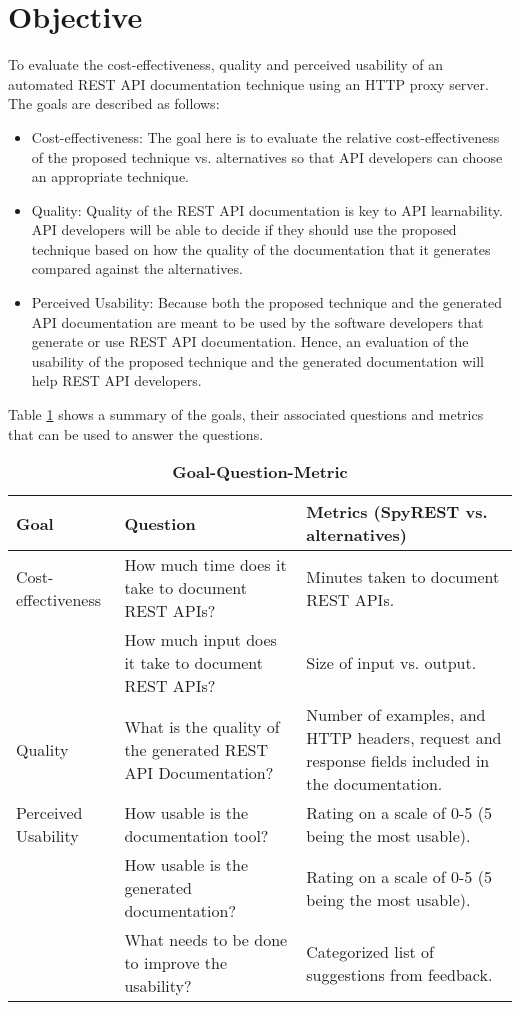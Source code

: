 \documentclass{article}
\begin{document}
\section{Objective}
To evaluate the cost-effectiveness, quality and perceived usability of an automated REST API documentation technique using an HTTP proxy server. The goals are described as follows:

\begin{itemize}
  \item Cost-effectiveness: The goal here is to evaluate the relative cost-effectiveness of the proposed technique vs. alternatives so that API developers can choose an appropriate technique.
  \item Quality: Quality of the REST API documentation is key to API learnability. API developers will be able to decide if they should use the proposed technique based on how the quality of the documentation that it generates compared against the alternatives.
  \item Perceived Usability: Because both the proposed technique and the generated API documentation are meant to be used by the software developers that generate or use REST API documentation. Hence, an evaluation of the usability of the proposed technique and the generated documentation will help REST API developers.
\end{itemize}

Table \ref{table:gqm} shows a summary of the goals, their associated questions and metrics that can be used to answer the questions.

\begin{table}[!h]
\caption{\textbf{Goal-Question-Metric}}
\label{table:gqm}
\begin{tabular}{|p{2cm}|p{4cm}|p{5cm}|}
  \hline
  \textbf{Goal} & \textbf{Question} & \textbf{Metrics (SpyREST vs. alternatives)} \\
  \hline
  Cost-effectiveness
    & How much time does it take to document REST APIs?
    & Minutes taken to document REST APIs.
     \\
    & How much input does it take to document REST APIs?
    & Size of input vs. output.
    \\
  \hline
  Quality
    & What is the quality of the generated REST API Documentation?
    & Number of examples, and HTTP headers, request and response fields included in the documentation.
    \\
  \hline
  Perceived Usability
    & How usable is the documentation tool?
    & Rating on a scale of 0-5 (5 being the most usable).
    \\
    & How usable is the generated documentation?
    & Rating on a scale of 0-5 (5 being the most usable).
    \\
    & What needs to be done to improve the usability?
    & Categorized list of suggestions from feedback.
    \\
  \hline
\end{tabular}
\end{table}
\end{document}
